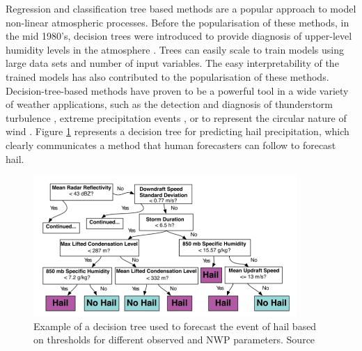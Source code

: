 Regression and classification tree based methods are a popular approach to model non-linear atmospheric processes. Before the popularisation of these methods, in the mid 1980's, decision trees were introduced to provide diagnosis of upper-level humidity levels in the atmosphere \citep{chisholm1968diagnosis}. Trees can easily scale to train models using large data sets and number of input variables. The easy interpretability of the trained models has also contributed to the popularisation of these methods. Decision-tree-based methods have proven to be a powerful tool in a wide variety of weather applications, such as the detection and diagnosis of thunderstorm turbulence \citep{williams2008remote}, extreme precipitation events \citep{herman2018money}, or to represent the circular nature of wind \citep{larraondo2018system}. Figure \ref{decision_tree} represents a decision tree for predicting hail precipitation, which clearly communicates a method that human forecasters can follow to forecast hail.

\medskip

\begin{figure}[h]
 \centerline{\includegraphics[width=10cm]{decision_tree.png}} \caption{Example of a decision tree used to forecast the event of hail based on thresholds for different observed and NWP parameters. Source \citep{mcgovern2017using}}\label{decision_tree}
\end{figure}

